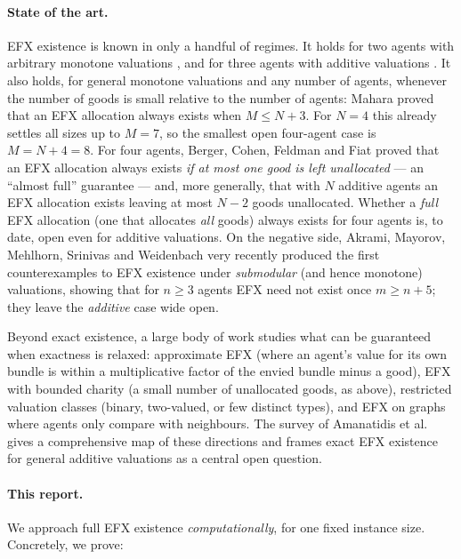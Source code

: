 \documentclass[11pt,a4paper]{article}
\theoremstyle{definition}
\theoremstyle{plain}
\newcommand{\EFX}{\textsf{EFX}}
\newcommand{\agents}{N}
\newcommand{\goods}{M}
\begin{document}
\paragraph{State of the art.}
\EFX{} existence is known in only a handful of regimes. It holds for two agents
with arbitrary monotone valuations \cite{PlautRoughgarden2020}, and for three
agents with additive valuations \cite{ChaudhuryGargMehlhorn2024}. It also holds,
for general monotone valuations and any number of agents, whenever the number of
goods is small relative to the number of agents: Mahara \cite{Mahara2024} proved
that an \EFX{} allocation always exists when $\goods\leq\agents+3$. For
$\agents=4$ this already settles all sizes up to $\goods=7$, so the smallest open
four-agent case is $\goods=\agents+4=8$. For four
agents, Berger, Cohen, Feldman and Fiat \cite{BergerCohenFeldmanFiat2022} proved
that an \EFX{} allocation always exists \emph{if at most one good is left
unallocated} --- an ``almost full'' guarantee --- and, more generally, that with
$\agents$ additive agents an \EFX{} allocation exists leaving at most
$\agents-2$ goods unallocated. Whether a \emph{full} \EFX{} allocation (one that
allocates \emph{all} goods) always exists for four agents is, to date, open even
for additive valuations. On the negative side, Akrami, Mayorov, Mehlhorn,
Srinivas and Weidenbach \cite{AkramiEtAl2026} very recently produced the first
counterexamples to \EFX{} existence under \emph{submodular} (and hence monotone)
valuations, showing that for $n\geq 3$ agents \EFX{} need not exist once
$m \geq n+5$; they leave the \emph{additive} case wide open.

Beyond exact existence, a large body of work studies what can be guaranteed when
exactness is relaxed: approximate \EFX{} (where an agent's value for its own
bundle is within a multiplicative factor of the envied bundle minus a good),
\EFX{} with bounded charity (a small number of unallocated goods, as above),
restricted valuation classes (binary, two-valued, or few distinct types), and
\EFX{} on graphs where agents only compare with neighbours. The survey of
Amanatidis et al.\ \cite{AmanatidisSurvey2023} gives a comprehensive map of these
directions and frames exact \EFX{} existence for general additive valuations as
a central open question.

\paragraph{This report.}
We approach full \EFX{} existence \emph{computationally}, for one fixed instance
size. Concretely, we prove:
\end{document}
